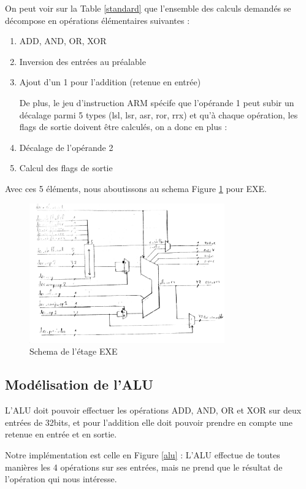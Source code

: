 \documentclass{article}
\begin{document}
On peut voir sur la Table \ref{standard} que l'ensemble des calculs demandés se décompose
en opérations élémentaires suivantes :
\begin{enumerate}
  \item ADD, AND, OR, XOR
  \item Inversion des entrées au préalable
  \item Ajout d'un 1 pour l'addition (retenue en entrée)

De plus, le jeu d'instruction ARM spécife que l'opérande 1 peut subir un décalage
parmi 5 types (lsl, lsr, asr, ror, rrx) et qu'à chaque opération, les flags de sortie
doivent être calculés, on a donc en plus :
  \item Décalage de l'opérande 2
  \item Calcul des flags de sortie
\end{enumerate}

Avec ces 5 éléments, nous aboutissons au schema Figure \ref{exe} pour EXE.

\begin{figure}[H]
\includegraphics[width=0.75\textwidth]{pics/exe.png}
\centering
\caption{Schema de l'étage EXE}
\label{exe}
\end{figure}

\subsection{Modélisation de l'ALU}

L'ALU doit pouvoir effectuer les opérations ADD, AND, OR et XOR sur deux entrées de 32bits,
et pour l'addition elle doit pouvoir prendre en compte une retenue en entrée et en sortie.

Notre implémentation est celle en Figure \ref{alu} : L'ALU effectue de toutes manières les
4 opérations sur ses entrées, mais ne prend que le résultat de l'opération qui nous intéresse.
\end{document}
